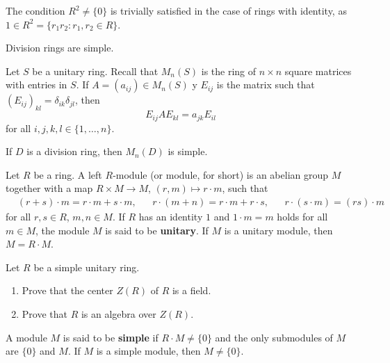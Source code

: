 The condition $R^2\ne\{0\}$ is trivially satisfied in the case of rings
with identity, as $1\in R^2=\{r_1r_2:r_1,r_2\in R\}$.

\begin{example}
	Division rings are simple.
\end{example}

Let $S$ be a unitary ring. Recall that $M_n(S)$ is the ring of $n\times n$ square matrices 
with entries in $S$.  If $A=(a_{ij})\in M_n(S)$ y $E_{ij}$ is the matrix
such that $(E_{ij})_{kl}=\delta_{ik}\delta_{jl}$, then
\begin{equation}
	\label{eq:trick}
E_{ij}AE_{kl}=a_{jk}E_{il}
\end{equation}
for all $i,j,k,l\in\{1,\dots,n\}$. 

\begin{example}
	If $D$ is a division ring, then $M_n(D)$ is simple. 
\end{example}

Let $R$ be a ring. A left $R$-module (or module, for short)  
is an abelian group $M$ together with a map $R\times M\to M$, $(r,m)\mapsto r\cdot m$, such that
\begin{align*}
	&(r+s)\cdot m=r\cdot m+s\cdot m, &&
	r\cdot (m+n)=r\cdot m+r\cdot s, && r\cdot (s\cdot m)=(rs)\cdot m    
\end{align*}
for all $r,s\in R$, $m,n\in M$.  If $R$ has an identity 
$1$ and $1\cdot m=m$ holds for all $m\in M$, the module $M$ is said to be 
\textbf{unitary}.  If $M$ is a unitary module, then $M=R\cdot M$. %

\begin{exercise}
\label{xca:center_simple}
Let $R$ be a simple unitary ring. 
\begin{enumerate}
    \item Prove that the center $Z(R)$ of $R$ is a field.
    \item Prove that $R$ is an algebra over $Z(R)$. 
\end{enumerate}
\end{exercise}


\begin{definition}
\label{Module!simple}
    A module $M$ is said to be 
    \textbf{simple} if $R\cdot M\ne\{0\}$ and 
    the only submodules of $M$ are $\{0\}$ and $M$.
    If $M$ is a simple module, then $M\ne\{0\}$.
\end{definition}

